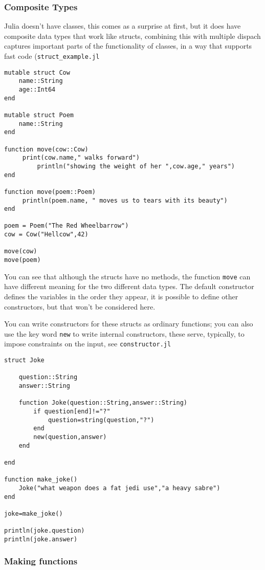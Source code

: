 \documentclass[11pt,a4paper]{scrartcl}
\begin{document}
\subsubsection*{Composite Types}
Julia doesn't have classes, this comes as a surprise at first, but it
does have composite data types that work like structs, combining this
with multiple dispach captures important parts of the functionality of
classes, in a way that supports fast code (\texttt{struct\_example.jl}
\begin{lstlisting}[numbers=right]
mutable struct Cow
	name::String
	age::Int64
end

mutable struct Poem
	name::String
end	

function move(cow::Cow)
	 print(cow.name," walks forward") 
         println("showing the weight of her ",cow.age," years")
end

function move(poem::Poem)
	 println(poem.name, " moves us to tears with its beauty")
end

poem = Poem("The Red Wheelbarrow")
cow = Cow("Hellcow",42)

move(cow)
move(poem)
\end{lstlisting}
You can see that although the structs have no methods, the function
\texttt{move} can have different meaning for the two different data
types. The default constructor defines the variables in the order they
appear, it is possible to define other constructors, but that won't be
considered here.

You can write constructors for these structs as ordinary functions; you can also use the key word \texttt{new} to write internal constructors, these serve, typically, to impose constraints on the input, see \texttt{constructor.jl}
\begin{lstlisting}[numbers=right]
struct Joke

    question::String
    answer::String

    function Joke(question::String,answer::String)
        if question[end]!="?"
            question=string(question,"?")
        end
        new(question,answer)
    end

end

function make_joke()
    Joke("what weapon does a fat jedi use","a heavy sabre")
end

joke=make_joke()

println(joke.question)
println(joke.answer)
\end{lstlisting}

\subsubsection*{Making functions}
\end{document}
